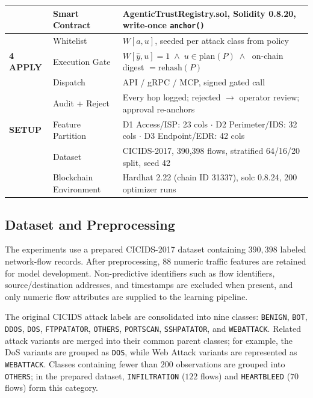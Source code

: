 \documentclass[10pt, conference]{IEEEtran}
\begin{document}
\begin{table}[t]
\begin{tabularx}{\textwidth}{|p{2.4cm}|p{3.4cm}|X|}
&
Smart Contract &
AgenticTrustRegistry.sol, Solidity 0.8.20, write-once \texttt{anchor()} \\
\hline

&
Whitelist &
$W[a,u]$, seeded per attack class from policy \\
\hline

\textbf{4 APPLY} &
Execution Gate &
$W[\hat{y},u]{=}1 \;\wedge\; u \in \mathrm{plan}(P)
\;\wedge\;$ on-chain digest $= \mathrm{rehash}(P)$ \\
\hline

&
Dispatch &
API / gRPC / MCP, signed gated call \\
\hline

&
Audit + Reject &
Every hop logged; rejected $\rightarrow$ operator review;
approval re-anchors \\
\hline

\textbf{SETUP} &
Feature Partition &
D1 Access/ISP: 23 cols $\cdot$
D2 Perimeter/IDS: 32 cols $\cdot$
D3 Endpoint/EDR: 42 cols \\
\hline

&
Dataset &
CICIDS-2017, 390,398 flows, stratified 64/16/20 split, seed 42 \\
\hline

&
Blockchain Environment &
Hardhat 2.22 (chain ID 31337), solc 0.8.24, 200 optimizer runs \\
\hline

\end{tabularx}

\label{tab:pipeline}
\end{table}



\subsection{Dataset and Preprocessing}

The experiments use a prepared CICIDS-2017 dataset containing $390{,}398$ labeled network-flow records. After preprocessing, $88$ numeric traffic features are retained for model development. Non-predictive identifiers such as flow identifiers, source/destination addresses, and timestamps are excluded when present, and only numeric flow attributes are supplied to the learning pipeline.

The original CICIDS attack labels are consolidated into nine classes:
\texttt{BENIGN}, \texttt{BOT}, \texttt{DDOS}, \texttt{DOS},
\texttt{FTPPATATOR}, \texttt{OTHERS}, \texttt{PORTSCAN},
\texttt{SSHPATATOR}, and \texttt{WEBATTACK}. Related attack variants are merged into their common parent classes; for example, the DoS variants are grouped as \texttt{DOS}, while Web Attack variants are represented as \texttt{WEBATTACK}. Classes containing fewer than $200$ observations are grouped into \texttt{OTHERS}; in the prepared dataset, \texttt{INFILTRATION} ($122$ flows) and \texttt{HEARTBLEED} ($70$ flows) form this category.
\end{document}

